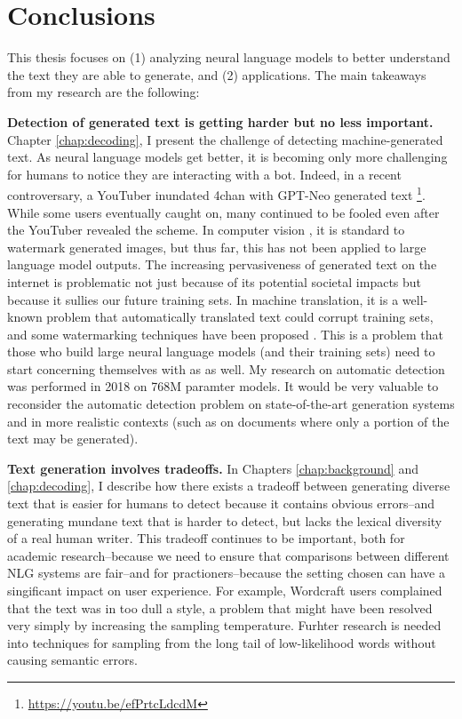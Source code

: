 \chapter{Conclusions}


This thesis focuses on (1) analyzing neural language models to better understand the text they are able to generate, and (2) applications.
The main takeaways from my research are the following:

\textbf{Detection of generated text is getting harder but no less important.}
	Chapter \ref{chap:decoding}, I present the challenge of detecting machine-generated text.
	As neural language models get better, it is becoming only more challenging for humans to notice they are interacting with a bot.
	Indeed, in a recent controversary, a YouTuber inundated 4chan with GPT-Neo generated text \footnote{\url{https://youtu.be/efPrtcLdcdM}}.
	While some users eventually caught on, many continued to be fooled even after the YouTuber revealed the scheme.
	In computer vision \citep{saharia2022photorealistic,ramesh2022hierarchical}, it is standard to watermark generated images, but thus far, this has not been applied to large language model outputs.
	The increasing pervasiveness of generated text on the internet is problematic not just because of its potential societal impacts but because it sullies our future training sets.
	In machine translation, it is a well-known problem that automatically translated text could corrupt training sets, and some watermarking techniques have been proposed \citep{venugopal2011watermarking}.
	This is a problem that those who build large neural language models (and their training sets) need to start concerning themselves with as as well.
	My research on automatic detection was performed in 2018 on 768M paramter models.
	It would be very valuable to reconsider the automatic detection problem on state-of-the-art generation systems and in more realistic contexts (such as on documents where only a portion of the text may be generated).

\textbf{Text generation involves tradeoffs.}
	In Chapters \ref{chap:background} and \ref{chap:decoding}, I describe how there exists a tradeoff between generating diverse text that is easier for humans to detect because it contains obvious errors--and generating mundane text that is harder to detect, but lacks the lexical diversity of a real human writer.
	This tradeoff continues to be important, both for academic research--because we need to ensure that  comparisons between different NLG systems are fair--and for practioners--because the setting chosen can have a singificant impact on user experience.
	For example, Wordcraft users complained that the text was in too dull a style, a problem that might have been resolved very simply by increasing the sampling temperature.
	Furhter research is needed into techniques for sampling from the long tail of low-likelihood words without causing semantic errors.

